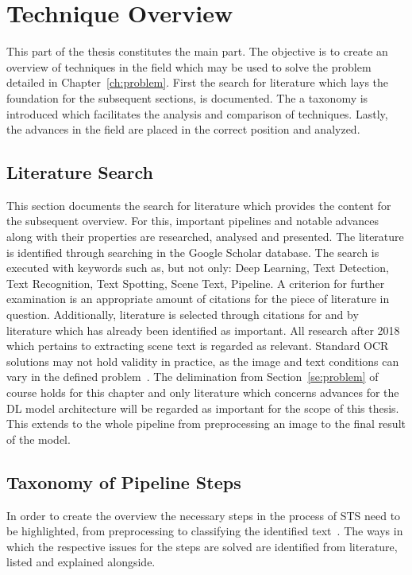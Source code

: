 \chapter{Technique Overview}\label{ch:research}
This part of the thesis constitutes the main part.
The objective is to create an overview of techniques in the field which may be used to solve the
problem detailed in Chapter~\ref{ch:problem}.
First the search for literature which lays the foundation for the subsequent sections, is documented.
The a taxonomy is introduced which facilitates the analysis and comparison of techniques.
Lastly, the advances in the field are placed in the correct position and analyzed.

\section{Literature Search}\label{se:litSearch}
This section documents the search for literature which provides the content for the subsequent
overview.
For this, important pipelines and notable advances along with their properties are researched,
analysed and presented.
The literature is identified through searching in the Google Scholar database.
The search is executed with keywords such as, but not only: Deep Learning, Text Detection,
Text Recognition, Text Spotting, Scene Text, Pipeline.
A criterion for further examination is an appropriate amount of citations for the piece of literature
in question.
Additionally, literature is selected through citations for and by literature which has already been
identified as important.
All research after 2018 which pertains to extracting scene text is regarded as relevant.
Standard \ac{OCR} solutions may not hold validity in practice, as the image and text conditions can
vary in the defined problem~\citep{chen_text_2021}.
The delimination from Section~\ref{se:problem} of course holds for this chapter and only literature
which concerns advances for the \ac{DL} model architecture will be regarded as important for the
scope of this thesis.
This extends to the whole pipeline from preprocessing an image to the final result of the model.


\section{Taxonomy of Pipeline Steps}
In order to create the overview the necessary steps in the process of \ac{STS} need to be highlighted,
from preprocessing to classifying the identified text~\citep{long_scene_2021, sourvanos_challenges_2018}.
The ways in which the respective issues for the steps are solved are identified from literature,
listed and explained alongside.

